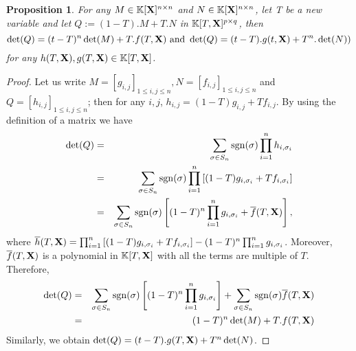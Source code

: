 \documentclass[11pt]{article}
\numberwithin{Property}{section}
\numberwithin{Theorem}{section}
\newtheorem{Proposition}{Proposition}%
\numberwithin{Proposition}{section}
\numberwithin{Lemma}{section}
\numberwithin{Corollary}{section}
\numberwithin{Definition}{section}
\numberwithin{Remark}{section}
\numberwithin{Conjecture}{section}
\numberwithin{Problem}{section}
\numberwithin{Claim}{section}
\theoremstyle{definition}
\numberwithin{Example}{section}
\renewcommand{\leq}{\leqslant}
\def\bar{\overline}
\newcommand{\field}{\mathbb{K}} %
\newcommand{\mat}[1]{\mathbf{\MakeUppercase{#1}}} %
\begin{document}
\begin{Proposition}\label{det}
For any $M \in \field[\mat{X}]^{n \times n}$ and $N \in \field[\mat{X}]^{n \times n}$, let T be a new variable and let $Q := (1-T).M + T.N$ in $\field[T, \mat{X}]^{p \times q}$, then 
\[
\det(Q) = (t-T)^n \det(M) + T.f(T,\mat{X}) \ \mathrm{and} \ \det(Q) = (t-T).g(t,\mat{X}) + T^n.\det(N)) 
\] for any $h(T,\mat{X}), g(T,\mat{X}) \in \field[T,\mat{X}]$.
\end{Proposition}
\begin{proof}
Let us write $M = [g_{i,j}]_{1 \leq i,j \leq n}, N = [f_{i,j}]_{1 \leq i,j \leq n}$ and $Q = [h_{i,j}]_{1 \leq i,j \leq n}$; then for any $i,j$,  $h_{i,j} = (1-T)g_{i,j} + Tf_{i,j}$. By using the definition of a matrix we have 
\begin{eqnarray*}
\det(Q) &=& \sum_{\sigma \in S_n}\mathrm{sgn}(\sigma)\prod_{i = 1}^nh_{i,\sigma_i}\\
&=& \sum_{\sigma \in S_n}\mathrm{sgn}(\sigma)\prod_{i = 1}^n\left[(1-T)g_{i,\sigma_i} + Tf_{i,\sigma_i}\right]\\
&=& \sum_{\sigma \in S_n}\mathrm{sgn}(\sigma)\left[(1-T)^n\prod_{i = 1}^ng_{i,\sigma_i} + \bar{f}(T,\mat{X})\right],
\end{eqnarray*}
where $\bar{h}(T,\mat{X}) = \prod_{i = 1}^n\left[(1-T)g_{i,\sigma_i} + Tf_{i,\sigma_i}\right] - (1-T)^n\prod_{i = 1}^ng_{i,\sigma_i}$. Moreover, $\bar{f}(T,\mat{X})$ is a polynomial in $\field[T, \mat{X}]$ with all the terms are multiple of $T$. Therefore, 
\begin{eqnarray*}
\det(Q) &=&  \sum_{\sigma \in S_n}\mathrm{sgn}(\sigma)\left[(1-T)^n\prod_{i = 1}^ng_{i,\sigma_i}\right] + \sum_{\sigma \in S_n}\mathrm{sgn}(\sigma)\bar{f}(T,\mat{X}) \\
&=& (1-T)^n\det(M) + T.f(T,\mat{X})
\end{eqnarray*}
Similarly, we obtain $\det(Q) = (t-T).g(T,\mat{X}) + T^n\det(N)$.
\end{proof}
\end{document}
